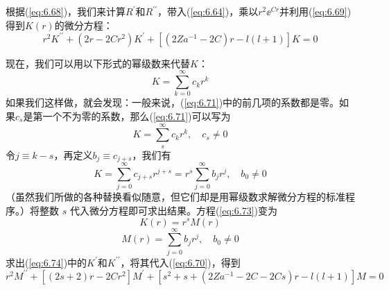    根据(\ref{eq:6.68})，我们来计算$R^{\prime}$和$R^{\prime\prime}$，带入(\ref{eq:6.64})，乘以$r^2\ee ^{Cr}$并利用(\ref{eq:6.69})得到$K\left(r\right)$的微分方程：
   \begin{equation}
        r^2K^{\prime\prime} + \left(2r - 2Cr^2\right)K^{\prime} + \left[\left(2Za^{-1} - 2C\right)r - l\left(l+1\right)\right]K = 0
        \label{eq:6.70}
   \end{equation}

   现在，我们可以用以下形式的幂级数来代替$K$：
   \begin{equation}
        K = \sum_{k=0}^{\infty}c_kr^k
        \label{eq:6.71}
   \end{equation}
   如果我们这样做，就会发现：一般来说，(\ref{eq:6.71})中的前几项的系数都是零。如果$c_s$是第一个不为零的系数，那么(\ref{eq:6.71})可以写为
   \begin{equation}
        K = \sum_{s}^{\infty}c_kr^k, \quad c_s \neq 0
        \label{eq:6.72}
   \end{equation}
   令$j \equiv k-s$，再定义$b_j \equiv c_{j+s}$，我们有
   \begin{equation}
        K = \sum_{j=0}^{\infty}c_{j+s}r^{j+s} = r^s\sum_{j=0}^{\infty}b_jr^j, \quad b_0 \neq 0
        \label{eq:6.73}
   \end{equation}
   （虽然我们所做的各种替换看似随意，但它们却是用幂级数求解微分方程的标准程序。）将整数 $s$ 代入微分方程即可求出结果。方程(\ref{eq:6.73})变为
   \begin{equation}
        K\left(r\right) = r^sM\left(r\right)
        \label{eq:6.74}
   \end{equation}
   \begin{equation}
        M\left(r\right) = \sum_{j=0}^{\infty}b_jr^j, \quad b_0 \neq 0
        \label{eq:6.75}
   \end{equation}
   求出(\ref{eq:6.74})中的$K^{\prime}$和$K^{\prime\prime}$，将其代入(\ref{eq:6.70})，得到
   \begin{equation}
        r^2M^{\prime\prime} + \left[\left(2s+2\right)r - 2Cr^2\right]M^{\prime} + \left[s^2 + s + \left(2Za^{-1} - 2C -2Cs\right)r - l\left(l+1\right)\right]M = 0
        \label{eq:6.76}
   \end{equation}

